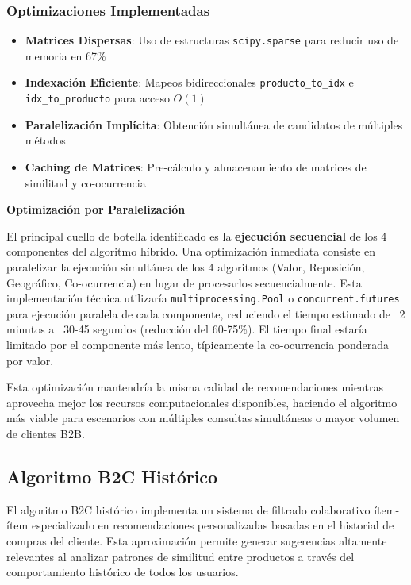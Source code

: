 \documentclass[twocolumn]{article}
\begin{document}
\subsubsection{Optimizaciones Implementadas}

\begin{itemize}
    \item \textbf{Matrices Dispersas}: Uso de estructuras \texttt{scipy.sparse} para reducir uso de memoria en 67\%
    \item \textbf{Indexación Eficiente}: Mapeos bidireccionales \texttt{producto\_to\_idx} e \texttt{idx\_to\_producto} para acceso \(O(1)\)
    \item \textbf{Paralelización Implícita}: Obtención simultánea de candidatos de múltiples métodos
    \item \textbf{Caching de Matrices}: Pre-cálculo y almacenamiento de matrices de similitud y co-ocurrencia
\end{itemize}

\textbf{Optimización por Paralelización}

El principal cuello de botella identificado es la \textbf{ejecución secuencial} de los 4 componentes del algoritmo híbrido. Una optimización inmediata consiste en paralelizar la ejecución simultánea de los 4 algoritmos (Valor, Reposición, Geográfico, Co-ocurrencia) en lugar de procesarlos secuencialmente. Esta implementación técnica utilizaría \texttt{multiprocessing.Pool} o \texttt{concurrent.futures} para ejecución paralela de cada componente, reduciendo el tiempo estimado de ~2 minutos a ~30-45 segundos (reducción del 60-75\%). El tiempo final estaría limitado por el componente más lento, típicamente la co-ocurrencia ponderada por valor.

Esta optimización mantendría la misma calidad de recomendaciones mientras aprovecha mejor los recursos computacionales disponibles, haciendo el algoritmo más viable para escenarios con múltiples consultas simultáneas o mayor volumen de clientes B2B.

\subsection{Algoritmo B2C Histórico}

El algoritmo B2C histórico implementa un sistema de filtrado colaborativo ítem-ítem especializado en recomendaciones personalizadas basadas en el historial de compras del cliente. Esta aproximación permite generar sugerencias altamente relevantes al analizar patrones de similitud entre productos a través del comportamiento histórico de todos los usuarios.
\end{document}
